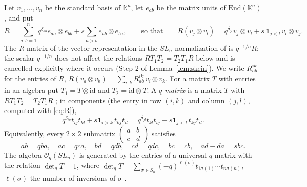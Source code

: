\documentclass[11pt]{article}
\theoremstyle{remark}
\newcommand{\kk}{\mathbb K}
\newcommand{\ot}{\otimes}
\newcommand{\id}{\mathrm{id}}
\newcommand{\Oq}{\mathcal O_q(SL_n)}
\begin{document}
Let $v_1,\dots,v_n$ be the standard basis of $\kk^n$, let $e_{ab}$ be
the matrix units of $\mathrm{End}(\kk^n)$, and put
\begin{equation}\label{eq:R}
 R=\sum_{a,b=1}^n q^{\delta_{ab}}e_{aa}\ot e_{bb}
       +s\sum_{a>b}e_{ab}\ot e_{ba},
 \qquad\text{so that}\qquad
 R(v_j\ot v_l)=q^{\delta_{jl}}v_j\ot v_l+s\,\mathbf1_{j<l}\,v_l\ot v_j.
\end{equation}
The $R$-matrix of the vector representation in the $SL_n$
normalization of \cite[Section 3.1]{LY} is $q^{-1/n}R$; the scalar
$q^{-1/n}$ does not affect the relations $RT_1T_2=T_2T_1R$ below and
is cancelled explicitly where it occurs (Step 2 of
Lemma~\ref{lem:skein}). We write $R^{ik}_{ab}$ for the entries of $R$,
$R(v_a\ot v_b)=\sum_{i,k}R^{ik}_{ab}\,v_i\ot v_k$. For a matrix $T$ with
entries in an algebra put $T_1=T\ot\id$ and $T_2=\id\ot T$. A
\emph{$q$-matrix} is a matrix $T$ with $RT_1T_2=T_2T_1R$
\cite{FRT}; in components (the entry in row $(i,k)$ and column $(j,l)$,
computed with \eqref{eq:R}),
\begin{equation}\label{eq:RTTcomponent}
 q^{\delta_{ik}}t_{ij}t_{kl}+s\mathbf1_{i>k}\,t_{kj}t_{il}
 =q^{\delta_{jl}}t_{kl}t_{ij}+s\mathbf1_{j<l}\,t_{kj}t_{il}.
\end{equation}
Equivalently, every $2\times2$ submatrix
$\left(\begin{smallmatrix}a&b\\c&d\end{smallmatrix}\right)$ satisfies
\begin{equation}\label{eq:qmatrix}
 ab=qba,\quad ac=qca,\quad bd=qdb,\quad cd=qdc,\quad
 bc=cb,\quad ad-da=sbc .
\end{equation}
The algebra $\Oq$ is generated by the entries of a universal $q$-matrix
with the relation $\det_qT=1$, where
$\det_qT=\sum_{\sigma\in S_n}(-q)^{\ell(\sigma)}t_{1\sigma(1)}\cdots
t_{n\sigma(n)}$, $\ell(\sigma)$ the number of inversions of $\sigma$
\cite[Section 9.2]{KS}.
\end{document}
